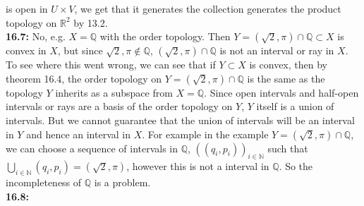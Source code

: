 \documentclass[a4paper]{article}
\begin{document}
        is open in $U \times V$, we get that it generates the collection
        generates the product topology on $\mathbb{R}^2$ by 13.2.\\
        \linebreak
        \textbf{16.7:} No, e.g. $X = \mathbb{Q}$ with the order topology. Then
        $Y = (\sqrt{2} , \pi) \cap \mathbb{Q} \subset X$ is convex in $X$, but since
        $\sqrt{2} , \pi \not\in \mathbb{Q}$, $(\sqrt{2} ,\pi) \cap \mathbb{Q}$
        is not an interval or ray in $X$.\\
        To see where this went wrong, we can see that if $Y \subset X$ is
        convex, then by theorem 16.4, the order topology on $Y = 
        (\sqrt{2} ,\pi) \cap \mathbb{Q}$ is the same as the topology $Y$ 
        inherits as a subspace from $X=\mathbb{Q}$. Since open intervals and
        half-open intervals or rays are a basis of the order topology on
        $Y$, $Y$ itself is a union of intervals. But we cannot guarantee that
        the union of intervals will be an interval in $Y$ and hence an interval
        in $X$. For example in the example $Y=(\sqrt{2} ,\pi) \cap \mathbb{Q}$,
        we can choose a sequence of intervals in $\mathbb{Q}$, $\left( 
        (q_i, p_i)\right)_{i \in \mathbb{N}}$ such that
        $\bigcup_{i \in \mathbb{N}} (q_i, p_i) =  (\sqrt{2} ,\pi)$, however
        this is not a interval in
        $\mathbb{Q}$. So the incompleteness of $\mathbb{Q}$ is a problem.\\
        \linebreak
        \textbf{16.8:}
\end{document}

